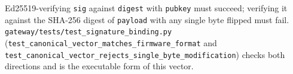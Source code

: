 Ed25519-verifying \texttt{sig} against \texttt{digest} with \texttt{pubkey}
must succeed; verifying it against the SHA-256 digest of \texttt{payload}
with any single byte flipped must fail. \texttt{gateway/tests/test\_signature\_binding.py}
(\texttt{test\_canonical\_vector\_matches\_firmware\_format} and
\texttt{test\_canonical\_vector\_rejects\_single\_byte\_modification}) checks
both directions and is the executable form of this vector.


